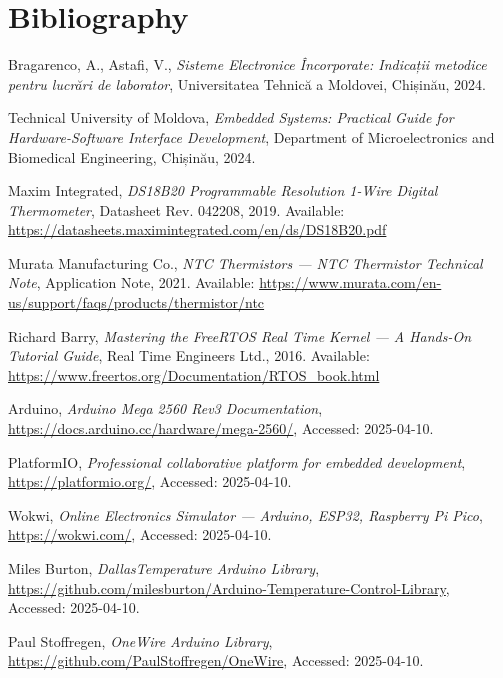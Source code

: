 \section{Bibliography}

\begin{enumerate}[label={[\arabic*]}]
    \item Bragarenco, A., Astafi, V., \textit{Sisteme Electronice Încorporate: Indicații metodice pentru lucrări de laborator}, Universitatea Tehnică a Moldovei, Chișinău, 2024.

    \item Technical University of Moldova, \textit{Embedded Systems: Practical Guide for Hardware-Software Interface Development}, Department of Microelectronics and Biomedical Engineering, Chișinău, 2024.

    \item Maxim Integrated, \textit{DS18B20 Programmable Resolution 1-Wire Digital Thermometer}, Datasheet Rev. 042208, 2019. Available: \url{https://datasheets.maximintegrated.com/en/ds/DS18B20.pdf}

    \item Murata Manufacturing Co., \textit{NTC Thermistors --- NTC Thermistor Technical Note}, Application Note, 2021. Available: \url{https://www.murata.com/en-us/support/faqs/products/thermistor/ntc}

    \item Richard Barry, \textit{Mastering the FreeRTOS Real Time Kernel --- A Hands-On Tutorial Guide}, Real Time Engineers Ltd., 2016. Available: \url{https://www.freertos.org/Documentation/RTOS_book.html}

    \item Arduino, \textit{Arduino Mega 2560 Rev3 Documentation}, \url{https://docs.arduino.cc/hardware/mega-2560/}, Accessed: 2025-04-10.

    \item PlatformIO, \textit{Professional collaborative platform for embedded development}, \url{https://platformio.org/}, Accessed: 2025-04-10.

    \item Wokwi, \textit{Online Electronics Simulator --- Arduino, ESP32, Raspberry Pi Pico}, \url{https://wokwi.com/}, Accessed: 2025-04-10.

    \item Miles Burton, \textit{DallasTemperature Arduino Library}, \url{https://github.com/milesburton/Arduino-Temperature-Control-Library}, Accessed: 2025-04-10.

    \item Paul Stoffregen, \textit{OneWire Arduino Library}, \url{https://github.com/PaulStoffregen/OneWire}, Accessed: 2025-04-10.
\end{enumerate}
